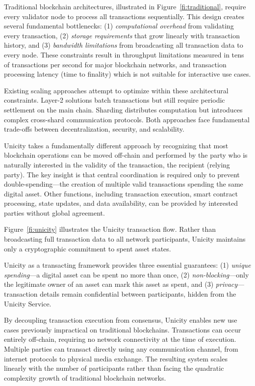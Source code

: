 \documentclass{article}
\begin{document}
Traditional blockchain architectures, illustrated in Figure~\ref{fi:traditional}, require every validator node to process all transactions sequentially. This design creates several fundamental bottlenecks: (1) \emph{computational overhead} from validating every transaction, (2) \emph{storage requirements} that grow linearly with transaction history, and (3) \emph{bandwidth limitations} from broadcasting all transaction data to every node. These constraints result in throughput limitations measured in tens of transactions per second for major blockchain networks, and transaction processing latency (time to finality) which is not suitable for interactive use cases.

Existing scaling approaches attempt to optimize within these architectural constraints. Layer-2 solutions batch transactions but still require periodic settlement on the main chain. Sharding distributes computation but introduces complex cross-shard communication protocols. Both approaches face fundamental trade-offs between decentralization, security, and scalability.

Unicity takes a fundamentally different approach by recognizing that most blockchain operations can be moved off-chain and performed by the party who is naturally interested in the validity of the transaction, the recipient (relying party). The key insight is that central coordination is required only to prevent double-spending---the creation of multiple valid transactions spending the same digital asset. Other functions, including transaction execution, smart contract processing, state updates, and data availability, can be provided by interested parties without global agreement.

Figure~\ref{fi:unicity} illustrates the Unicity transaction flow. Rather than broadcasting full transaction data to all network participants, Unicity maintains only a cryptographic commitment to spent asset states.

Unicity as a transacting framework provides three essential guarantees: (1) \emph{unique spending}—a digital asset can be spent no more than once, (2) \emph{non-blocking}—only the legitimate owner of an asset can mark this asset as spent, and (3) \emph{privacy}—transaction details remain confidential between participants, hidden from the Unicity Service.

By decoupling transaction execution from consensus, Unicity enables new use cases previously impractical on traditional blockchains. Transactions can occur entirely off-chain, requiring no network connectivity at the time of execution. Multiple parties can transact directly using any communication channel, from internet protocols to physical media exchange. The resulting system scales linearly with the number of participants rather than facing the quadratic complexity growth of traditional blockchain networks.
\end{document}
